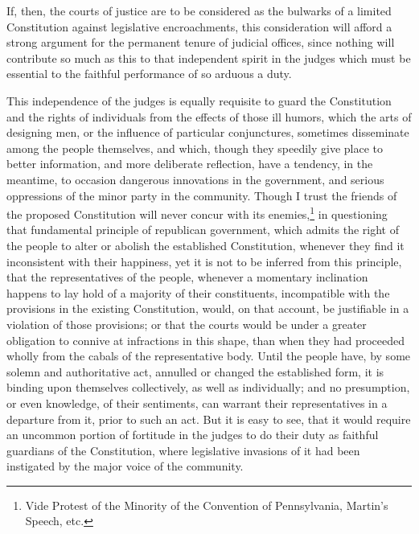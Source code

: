 If, then, the courts of justice are to be considered as the bulwarks of a limited Constitution against legislative encroachments, this consideration will afford a strong argument for the permanent tenure of judicial offices, since nothing will contribute so much as this to that independent spirit in the judges which must be essential to the faithful performance of so arduous a duty.

This independence of the judges is equally requisite to guard the Constitution and the rights of individuals from the effects of those ill humors, which the arts of designing men, or the influence of particular conjunctures, sometimes disseminate among the people themselves, and which, though they speedily give place to better information, and more deliberate reflection, have a tendency, in the meantime, to occasion dangerous innovations in the government, and serious oppressions of the minor party in the community. 
Though I trust the friends of the proposed Constitution will never concur with its enemies,\footnote{Vide Protest of the Minority of the Convention of Pennsylvania, Martin's Speech, etc.} in questioning that fundamental principle of republican government, which admits the right of the people to alter or abolish the established Constitution, whenever they find it inconsistent with their happiness, yet it is not to be inferred from this principle, that the representatives of the people, whenever a momentary inclination happens to lay hold of a majority of their constituents, incompatible with the provisions in the existing Constitution, would, on that account, be justifiable in a violation of those provisions; or that the courts would be under a greater obligation to connive at infractions in this shape, than when they had proceeded wholly from the cabals of the representative body. 
Until the people have, by some solemn and authoritative act, annulled or changed the established form, it is binding upon themselves collectively, as well as individually; and no presumption, or even knowledge, of their sentiments, can warrant their representatives in a departure from it, prior to such an act. 
But it is easy to see, that it would require an uncommon portion of fortitude in the judges to do their duty as faithful guardians of the Constitution, where legislative invasions of it had been instigated by the major voice of the community.

